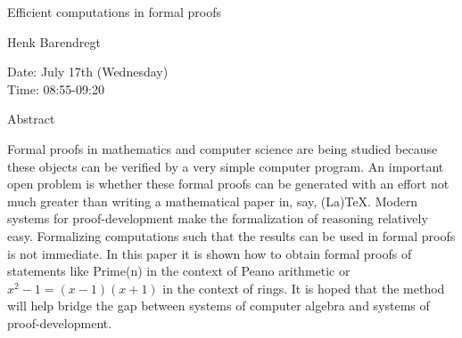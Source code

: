 \begin{center}
\LARGE
Efficient computations in formal proofs

\end{center}

\begin{center}
\Large
Henk Barendregt

\end{center}

\noindent
Date:  July 17th (Wednesday)\\
Time:  08:55-09:20\\

\begin{center}
\large
Abstract
\end{center}

Formal proofs in mathematics and computer science are being studied
because these objects can be verified by a very simple computer
program. An important open problem is whether these formal proofs can
be generated with an effort not much greater than writing a
mathematical paper in, say, (La)TeX. Modern systems for
proof-development make the formalization of reasoning relatively easy.
Formalizing computations such that the results can be used in formal
proofs is not immediate. In this paper it is shown how to obtain
formal proofs of statements like Prime(n) in the context of Peano
arithmetic or $x^2-1=(x-1)(x+1)$ in the context of rings. It is hoped
that the method will help bridge the gap between systems of computer
algebra and systems of proof-development.

